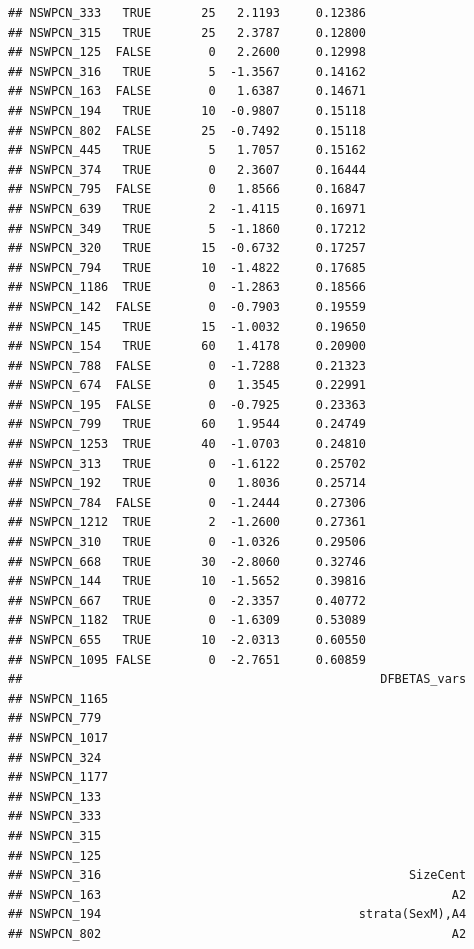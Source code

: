\documentclass{article}\usepackage[]{graphicx}\usepackage[]{color}
\makeatletter
\newenvironment{kframe}{%
 \def\at@end@of@kframe{}%
 \ifinner\ifhmode%
  \def\at@end@of@kframe{\end{minipage}}%
  \begin{minipage}{\columnwidth}%
 \fi\fi%
 \def\FrameCommand##1{\hskip\@totalleftmargin \hskip-\fboxsep
 \colorbox{shadecolor}{##1}\hskip-\fboxsep
     \hskip-\linewidth \hskip-\@totalleftmargin \hskip\columnwidth}%
 \MakeFramed {\advance\hsize-\width
   \@totalleftmargin\z@ \linewidth\hsize
   \@setminipage}}%
 {\par\unskip\endMakeFramed%
 \at@end@of@kframe}
\newenvironment{knitrout}{}{} %
\makeatother
\begin{document}
\begin{knitrout}
\begin{kframe}
\begin{verbatim}
## NSWPCN_333   TRUE       25   2.1193     0.12386
## NSWPCN_315   TRUE       25   2.3787     0.12800
## NSWPCN_125  FALSE        0   2.2600     0.12998
## NSWPCN_316   TRUE        5  -1.3567     0.14162
## NSWPCN_163  FALSE        0   1.6387     0.14671
## NSWPCN_194   TRUE       10  -0.9807     0.15118
## NSWPCN_802  FALSE       25  -0.7492     0.15118
## NSWPCN_445   TRUE        5   1.7057     0.15162
## NSWPCN_374   TRUE        0   2.3607     0.16444
## NSWPCN_795  FALSE        0   1.8566     0.16847
## NSWPCN_639   TRUE        2  -1.4115     0.16971
## NSWPCN_349   TRUE        5  -1.1860     0.17212
## NSWPCN_320   TRUE       15  -0.6732     0.17257
## NSWPCN_794   TRUE       10  -1.4822     0.17685
## NSWPCN_1186  TRUE        0  -1.2863     0.18566
## NSWPCN_142  FALSE        0  -0.7903     0.19559
## NSWPCN_145   TRUE       15  -1.0032     0.19650
## NSWPCN_154   TRUE       60   1.4178     0.20900
## NSWPCN_788  FALSE        0  -1.7288     0.21323
## NSWPCN_674  FALSE        0   1.3545     0.22991
## NSWPCN_195  FALSE        0  -0.7925     0.23363
## NSWPCN_799   TRUE       60   1.9544     0.24749
## NSWPCN_1253  TRUE       40  -1.0703     0.24810
## NSWPCN_313   TRUE        0  -1.6122     0.25702
## NSWPCN_192   TRUE        0   1.8036     0.25714
## NSWPCN_784  FALSE        0  -1.2444     0.27306
## NSWPCN_1212  TRUE        2  -1.2600     0.27361
## NSWPCN_310   TRUE        0  -1.0326     0.29506
## NSWPCN_668   TRUE       30  -2.8060     0.32746
## NSWPCN_144   TRUE       10  -1.5652     0.39816
## NSWPCN_667   TRUE        0  -2.3357     0.40772
## NSWPCN_1182  TRUE        0  -1.6309     0.53089
## NSWPCN_655   TRUE       10  -2.0313     0.60550
## NSWPCN_1095 FALSE        0  -2.7651     0.60859
##                                                  DFBETAS_vars
## NSWPCN_1165                                                  
## NSWPCN_779                                                   
## NSWPCN_1017                                                  
## NSWPCN_324                                                   
## NSWPCN_1177                                                  
## NSWPCN_133                                                   
## NSWPCN_333                                                   
## NSWPCN_315                                                   
## NSWPCN_125                                                   
## NSWPCN_316                                           SizeCent
## NSWPCN_163                                                 A2
## NSWPCN_194                                    strata(SexM),A4
## NSWPCN_802                                                 A2

\end{verbatim}
\end{kframe}
\end{knitrout}
\end{document}
